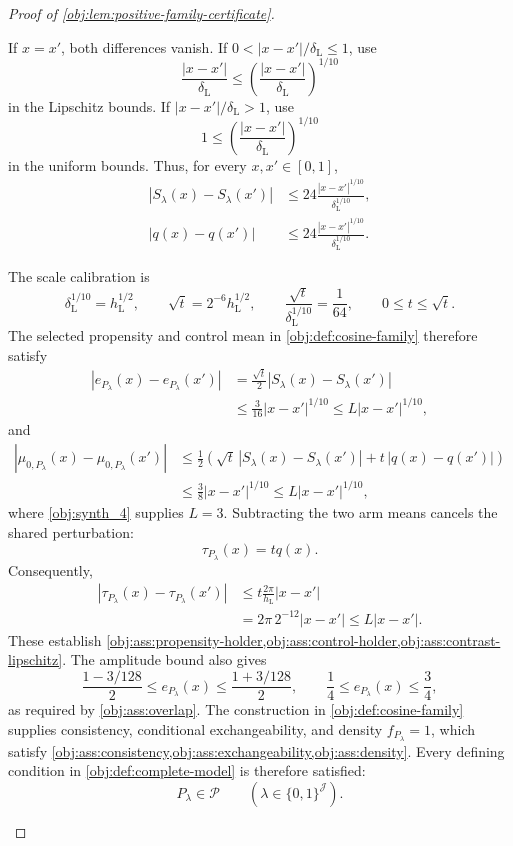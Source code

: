 \begin{proof}[Proof of \cref{obj:lem:positive-family-certificate}]
\begin{enumerate}
If \(x=x'\), both differences vanish. If
\(0<|x-x'|/\delta_{\mathrm L}\le1\), use
\[
\frac{|x-x'|}{\delta_{\mathrm L}}
\le
\left(\frac{|x-x'|}{\delta_{\mathrm L}}\right)^{1/10}
\]
in the Lipschitz bounds. If
\(|x-x'|/\delta_{\mathrm L}>1\), use
\[
1\le
\left(\frac{|x-x'|}{\delta_{\mathrm L}}\right)^{1/10}
\]
in the uniform bounds. Thus, for every \(x,x'\in[0,1]\),
\[
\begin{aligned}
|S_\lambda(x)-S_\lambda(x')|
&\le24\frac{|x-x'|^{1/10}}{\delta_{\mathrm L}^{1/10}},\\
|q(x)-q(x')|
&\le24\frac{|x-x'|^{1/10}}{\delta_{\mathrm L}^{1/10}}.
\end{aligned}
\]

The scale calibration is
\[
\delta_{\mathrm L}^{1/10}=h_{\mathrm L}^{1/2},
\qquad
\sqrt t=2^{-6}h_{\mathrm L}^{1/2},
\qquad
\frac{\sqrt t}{\delta_{\mathrm L}^{1/10}}=\frac1{64},
\qquad
0\le t\le\sqrt t.
\]
The selected propensity and control mean in
\cref{obj:def:cosine-family} therefore satisfy
\[
\begin{aligned}
|e_{P_\lambda}(x)-e_{P_\lambda}(x')|
&=\frac{\sqrt t}{2}|S_\lambda(x)-S_\lambda(x')|\\
&\le\frac3{16}|x-x'|^{1/10}
\le L|x-x'|^{1/10},
\end{aligned}
\]
and
\[
\begin{aligned}
|\mu_{0,P_\lambda}(x)-\mu_{0,P_\lambda}(x')|
&\le\frac12\left(
 \sqrt t\,|S_\lambda(x)-S_\lambda(x')|
 +t\,|q(x)-q(x')|\right)\\
&\le\frac38|x-x'|^{1/10}
\le L|x-x'|^{1/10},
\end{aligned}
\]
where \cref{obj:synth_4} supplies \(L=3\).
Subtracting the two arm means cancels the shared perturbation:
\[
\tau_{P_\lambda}(x)=tq(x).
\]
Consequently,
\[
\begin{aligned}
|\tau_{P_\lambda}(x)-\tau_{P_\lambda}(x')|
&\le t\frac{2\pi}{h_{\mathrm L}}|x-x'|\\
&=2\pi\,2^{-12}|x-x'|
\le L|x-x'|.
\end{aligned}
\]
These establish
\cref{obj:ass:propensity-holder,obj:ass:control-holder,obj:ass:contrast-lipschitz}.
The amplitude bound also gives
\[
\frac{1-3/128}{2}\le e_{P_\lambda}(x)
\le\frac{1+3/128}{2},
\qquad
\frac14\le e_{P_\lambda}(x)\le\frac34,
\]
as required by \cref{obj:ass:overlap}.
The construction in \cref{obj:def:cosine-family} supplies consistency,
conditional exchangeability, and density \(f_{P_\lambda}=1\), which
satisfy
\cref{obj:ass:consistency,obj:ass:exchangeability,obj:ass:density}.
Every defining condition in \cref{obj:def:complete-model} is therefore
satisfied:
\[
P_\lambda\in\mathcal P\qquad
(\lambda\in\{0,1\}^{\mathcal J}).
\]


\end{enumerate}
\end{proof}
